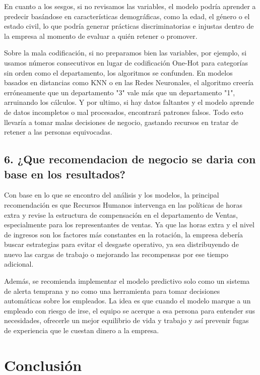 \documentclass[letterpaper,11pt]{article}
\begin{document}
En cuanto a los sesgos, si no revisamos las variables, el modelo podría aprender a predecir basándose en características demográficas, como la edad, el género o el estado civil, lo que podría generar prácticas discriminatorias e injustas dentro de la empresa al momento de evaluar a quién retener o promover.

Sobre la mala codificación, si no preparamos bien las variables, por ejemplo, si usamos números consecutivos en lugar de codificación One-Hot para categorías sin orden como el departamento, los algoritmos se confunden. En modelos basados en distancias como KNN o en las Redes Neuronales, el algoritmo creería erróneamente que un departamento "3" vale más que un departamento "1", arruinando los cálculos. Y por ultimo, si hay datos faltantes y el modelo aprende de datos incompletos o mal procesados, encontrará patrones falsos. Todo esto llevaría a tomar malas decisiones de negocio, gastando recursos en tratar de retener a las personas equivocadas.

\subsection*{6. ¿Que recomendacion de negocio se daria con base en los resultados?}

Con base en lo que se encontro del análisis y los modelos, la principal recomendación es que Recursos Humanos intervenga en las políticas de horas extra y revise la estructura de compensación en el departamento de Ventas, especialmente para los representantes de ventas. Ya que las horas extra y el nivel de ingresos son los factores más constantes en la rotación, la empresa debería buscar estrategias para evitar el desgaste operativo, ya sea distribuyendo de nuevo las cargas de trabajo o mejorando las recompensas por ese tiempo adicional.

Además, se recomienda implementar el modelo predictivo solo como un sistema de alerta temprana y no como una herramienta para tomar decisiones automáticas sobre los empleados. La idea es que cuando el modelo marque a un empleado con riesgo de irse, el equipo se acerque a esa persona para entender sus necesidades, ofrecerle un mejor equilibrio de vida y trabajo y así prevenir fugas de experiencia que le cuestan dinero a la empresa.

\section*{Conclusión}
\end{document}
